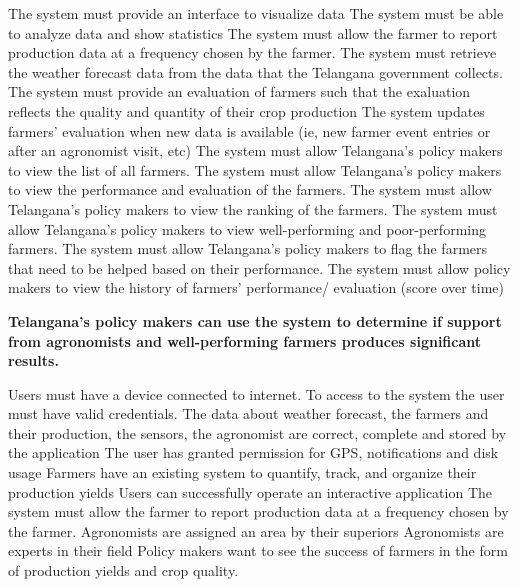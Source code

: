 \begin{itemize}
\begin{itemize}
 The system must provide an interface to visualize data
 The system must be able to analyze data and show statistics
 The system must allow the farmer to report production data at a frequency chosen by the farmer.
 The system must retrieve the weather forecast data from the data that the Telangana government collects.
  The system must provide an evaluation of farmers such that the exaluation reflects the quality and quantity of their crop production
  The system updates farmers' evaluation when new data is available (ie, new farmer event entries or after an agronomist visit, etc)
 The system must allow Telangana’s policy makers to view the list of all farmers.
 The system must allow Telangana’s policy makers to view the performance and evaluation of the farmers.
 The system must allow Telangana’s policy makers to view the ranking of the farmers.
 The system must allow Telangana’s policy makers to view well-performing and poor-performing farmers.
 The system must allow Telangana’s policy makers to flag the farmers that need to be helped based on their performance.
 The system must allow policy makers to view the history of farmers’ performance/ evaluation (score over time)
\end{itemize}

 \textbf{Telangana’s policy makers can use the system to determine if support from agronomists and well-performing farmers produces significant results.}

\begin{itemize}
  Users must have a device connected to internet.
 To access to the system the user must have valid credentials.
 The data about weather forecast, the farmers and their production, the sensors, the agronomist are correct, complete and stored by the application
 The user has granted permission for GPS, notifications and disk usage
 Farmers have an existing system to quantify, track, and organize their production yields
 Users can successfully operate an interactive application
 The system must allow the farmer to report production data at a frequency chosen by the farmer.
 Agronomists are assigned an area by their superiors
 Agronomists are experts in their field
 Policy makers want to see the success of farmers in the form of production yields and crop quality.


\end{itemize}
\end{itemize}
